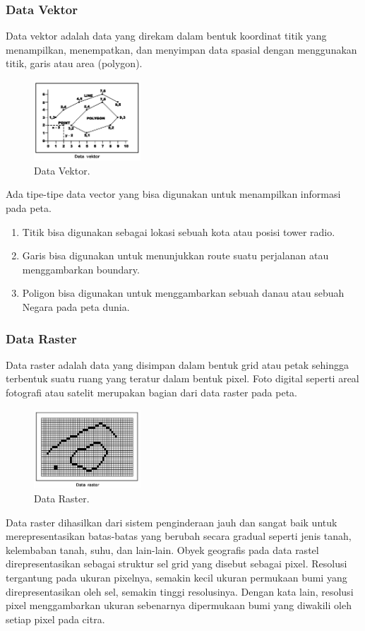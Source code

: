 \subsubsection{Data Vektor}
Data vektor adalah data yang direkam dalam bentuk koordinat titik yang menampilkan, menempatkan, dan menyimpan data spasial dengan menggunakan titik, garis atau area (polygon).
\begin{figure}[H]
	\includegraphics[width=4cm]{figures/1174006/1174006vektor1.png}
	\centering
	\caption{Data Vektor.}
\end{figure}
Ada tipe-tipe data vector yang bisa digunakan untuk menampilkan informasi pada peta. 
\begin{enumerate}
	\item Titik bisa digunakan sebagai lokasi sebuah kota atau posisi tower radio. 
	\item Garis bisa digunakan untuk menunjukkan route suatu perjalanan atau menggambarkan boundary.
	\item Poligon bisa digunakan untuk menggambarkan sebuah danau atau sebuah Negara pada peta dunia.
\end{enumerate}

\subsubsection{Data Raster}
Data raster adalah data yang disimpan dalam bentuk grid atau petak sehingga terbentuk suatu ruang yang teratur dalam bentuk pixel. 
Foto digital seperti areal fotografi atau satelit merupakan bagian dari data raster pada peta.
\begin{figure}[H]
	\includegraphics[width=4cm]{figures/1174006/1174006raster1.png}
	\centering
	\caption{Data Raster.}
\end{figure}
Data raster dihasilkan dari sistem penginderaan jauh dan sangat baik untuk merepresentasikan batas-batas yang berubah secara gradual seperti jenis tanah, kelembaban tanah, suhu, dan lain-lain.
Obyek geografis pada data rastel direpresentasikan sebagai struktur sel grid yang disebut sebagai pixel.
Resolusi tergantung pada ukuran pixelnya, semakin kecil ukuran permukaan bumi yang direpresentasikan oleh sel, semakin tinggi resolusinya. Dengan kata lain, resolusi pixel menggambarkan ukuran sebenarnya dipermukaan bumi yang diwakili oleh setiap pixel pada citra.

